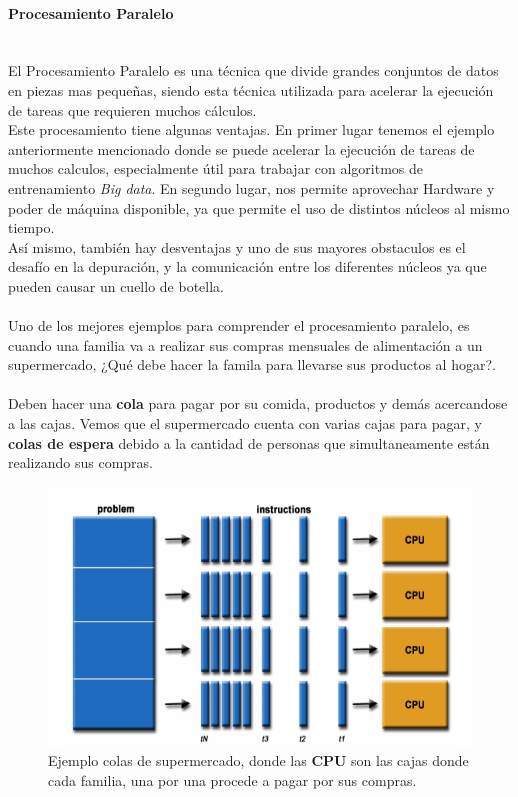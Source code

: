 \documentclass[a4paper]{report} %
\begin{document}
            \paragraph{Procesamiento Paralelo}\mbox{} \\
              El Procesamiento Paralelo es una técnica que divide grandes conjuntos de datos en piezas mas pequeñas, siendo esta técnica utilizada para acelerar la ejecución de tareas que requieren muchos cálculos.
              \\Este procesamiento tiene algunas ventajas. En primer lugar tenemos el ejemplo anteriormente mencionado donde se puede acelerar la ejecución de tareas de muchos calculos, especialmente útil para trabajar con algoritmos de entrenamiento \textit{Big data}. En segundo lugar, nos permite aprovechar Hardware y poder de máquina disponible, ya que permite el uso de distintos núcleos al mismo tiempo.
              \\Así mismo, también hay desventajas y uno de sus mayores obstaculos es el desafío en la depuración, y la comunicación entre los diferentes núcleos ya que pueden causar un cuello de botella.
              \\\\Uno de los mejores ejemplos para comprender el procesamiento paralelo, es cuando una familia va a realizar sus compras mensuales de alimentación a un supermercado, ¿Qué debe hacer la famila para llevarse sus productos al hogar?.
             \\\\Deben hacer una \textbf {cola} para pagar por su comida, productos y demás acercandose a las cajas. Vemos que el supermercado cuenta con varias cajas para pagar, y \textbf {colas de espera} debido a la cantidad de personas que simultaneamente están realizando sus compras.
                  \begin{figure}[htb]
                  \centering
                  \includegraphics[width=\textwidth]{Images/Paralelo-ej1.png}
                  \caption{Ejemplo colas de supermercado, donde las \textbf{CPU} son las cajas donde cada familia, una por una procede a pagar por sus compras.}
                  \label{fig1:paralelo-ej1}
                \end{figure}
\end{document}
